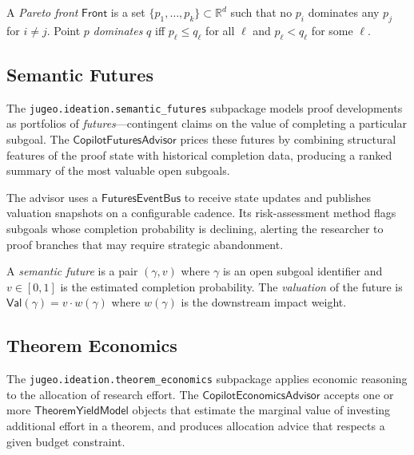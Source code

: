 \documentclass[11pt]{article}
\newcommand{\Front}{\mathsf{Front}}
\newcommand{\Valuation}{\mathsf{Val}}
\begin{document}
\begin{definition}\label{def:pareto-front}
A \emph{Pareto front} $\Front$ is a set
$\{p_1, \ldots, p_k\} \subset \mathbb{R}^d$ such that no
$p_i$ dominates any $p_j$ for $i \neq j$.  Point $p$
\emph{dominates} $q$ iff $p_\ell \leq q_\ell$ for all
$\ell$ and $p_\ell < q_\ell$ for some $\ell$.
\end{definition}

\subsection{Semantic Futures}\label{sec:ideation-futures}

The \texttt{jugeo.ideation.semantic\_futures} subpackage models
proof developments as portfolios of \emph{futures}—contingent
claims on the value of completing a particular subgoal.  The
$\mathsf{CopilotFuturesAdvisor}$ prices these futures by
combining structural features of the proof state with historical
completion data, producing a ranked summary of the most valuable
open subgoals.

The advisor uses a $\mathsf{FuturesEventBus}$ to receive
state updates and publishes valuation snapshots on a
configurable cadence.  Its risk-assessment method flags
subgoals whose completion probability is declining, alerting
the researcher to proof branches that may require strategic
abandonment.

\begin{definition}\label{def:semantic-future}
A \emph{semantic future} is a pair $(\gamma, v)$ where
$\gamma$ is an open subgoal identifier and
$v \in [0, 1]$ is the estimated completion probability.
The \emph{valuation} of the future is $\Valuation(\gamma) = v
\cdot w(\gamma)$ where $w(\gamma)$ is the downstream impact
weight.
\end{definition}

\subsection{Theorem Economics}\label{sec:ideation-economics}

The \texttt{jugeo.ideation.theorem\_economics} subpackage
applies economic reasoning to the allocation of research effort.
The $\mathsf{CopilotEconomicsAdvisor}$ accepts one or more
$\mathsf{TheoremYieldModel}$ objects that estimate the marginal
value of investing additional effort in a theorem, and produces
allocation advice that respects a given budget constraint.
\end{document}
